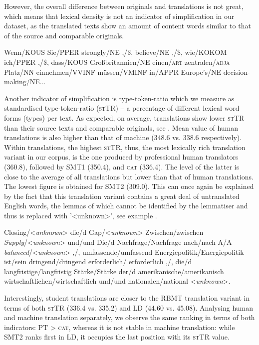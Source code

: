 \documentclass[output=paper]{LSP/langsci}
\begin{document}
However, the overall difference between originals and translations is not great, which means that lexical density is not an indicator of simplification in our dataset, as the translated texts show an amount of content words similar to that of the source and comparable originals.

\ea \label{ex:4:1}
Wenn/KOUS Sie/PPER strongly/NE ,/\$, believe/NE ,/\$, wie/KOKOM ich/PPER ,/\$, dass/KOUS Großbritannien/NE einen/\textsc{art} zentralen/\textsc{adja} Platz/NN einnehmen/VVINF müssen/VMINF in/APPR Europe’s/NE decision-making/NE...
\z

Another indicator of simplification is type-token-ratio which we measure as standardised type-token-ratio (\textsc{st}TR) – a percentage of different lexical word forms (types) per text.  As expected, on average, translations show lower \textsc{st}TR than their source texts and comparable originals, see . Mean value of human translations is also higher than that of machine (348.6 vs. 338.6 respectively). Within translations, the highest \textsc{st}TR, thus, the most lexically rich translation variant in our corpus, is the one produced by professional human translators (360.8), followed by SMT1 (350.4), and \textsc{cat} (336.4).  The level of the latter is close to the average of all translations but lower than that of human translations. The lowest figure is obtained for SMT2 (309.0). This can once again be explained by the fact that this translation variant contains a great deal of untranslated English words, the lemmas of which cannot be identified by the lemmatiser and thus is replaced with '<unknown>’, see example .

\ea \label{ex:4:2}
Closing/<\textit{unknown}> die/d Gap/<\textit{unknown}> Zwischen/zwischen \textit{Supply}/<\textit{unknown}> und/und Die/d Nachfrage/Nachfrage nach/nach A/A \textit{balanced}/<\textit{unknown}> ,/, umfassende/umfassend Energiepolitik/Energiepolitik ist/sein dringend/dringend erforderlich/  erforderlich ,/, die/d langfristige/langfristig Stärke/Stärke der/d  amerikanische/amerikanisch wirtschaftlichen/wirtschaftlich und/und nationalen/national <\textit{unknown}>.
\z

Interestingly, student translations are closer to the RBMT translation variant in terms of both \textsc{st}TR (336.4 vs. 335.2) and LD (44.60 vs. 45.08). Analysing human and machine translation separately, we observe the same ranking in terms of both indicators: PT > \textsc{cat}, whereas it is not stable in machine translation: while SMT2 ranks first in LD, it occupies the last position with its \textsc{st}TR value.
\end{document}
